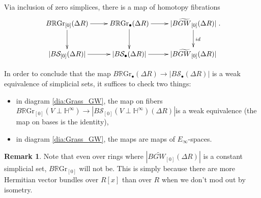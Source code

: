 \documentclass[edeposit,fullpage]{uiucthesis2009}
\newcommand{\mbb}{\mathbb}
\newcommand{\mc}{\mathcal}
\newcommand{\RGr}{\mathbb R\mathrm{Gr}}
\theoremstyle{plain}
\numberwithin{lemma}{section}
\theoremstyle{definition}
\newtheorem{remark}[lemma]{Remark}
\begin{document}
Via inclusion of zero simplices, there is a map of homotopy fibrations
\begin{equation}\label{dia:Grass_GW}
\begin{gathered}
\xymatrix{B\RGr_{[0]}(\Delta R) \ar[r]\ar[d] & B\RGr_\bullet(\Delta R) \ar[d] \ar[r] &
  |B\widetilde{GW}_{[0]}(\Delta R)| \ar[d]^{id} \\
|B\mc S_{[0]}(\Delta R)| \ar[r]& |B\mc S_\bullet(\Delta R)| \ar[r] &
  |B\widetilde{GW}_{[0]}(\Delta R)|}. 
\end{gathered}
\end{equation}

In order to conclude that the map $B\RGr_\bullet(\Delta R) \rightarrow
|B \mc S_\bullet (\Delta R)|$ is a weak equivalence of simplicial
sets, it suffices to check two things:
\begin{itemize}
\item in diagram \ref{dia:Grass_GW}, the map on fibers $B\RGr_{[0]}(V
  \perp \mbb H^\infty) \rightarrow |B\mc S_{[0]}(V \perp \mbb H^\infty)(\Delta R)| $is a weak
  equivalence (the map on bases is the identity),
\item in diagram \ref{dia:Grass_GW}, the maps are maps of
  $E_\infty$-spaces.
\end{itemize}

\begin{remark}
Note that even over rings where $|B\widetilde{GW}_{[0]}(\Delta R)|$ is
a constant simplicial set, $B\RGr_{[0]}$ will
not be. This is simply because there are more Hermitian vector bundles over
$R[x]$ than over $R$ when we don't mod out by isometry. 

\end{remark}
\end{document}
